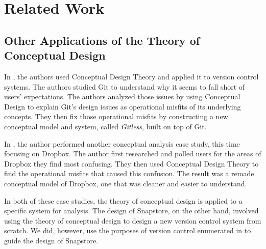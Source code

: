 \chapter{Related Work}

\section{Other Applications of the Theory of Conceptual Design}



In \cite{RossoJackson}, the authors used Conceptual Design Theory and applied it to version control systems. The authors studied Git to understand why it seems to fall short of users' expectations. The authors analyzed those issues by using Conceptual Design to explain Git's design issues as operational misfits of its underlying concepts. They then fix those operational misfits by constructing a new conceptual model and system, called \textit{Gitless}, built on top of Git.

In \cite{Zhang}, the author performed another conceptual analysis case study, this time focusing on Dropbox. The author first researched and polled users for the areas of Dropbox they find most confusing. They then used Conceptual Design Theory to find the operational misfits that caused this confusion. The result was a remade conceptual model of Dropbox, one that was cleaner and easier to understand.

In both of these case studies, the theory of conceptual design is applied to a specific system for analysis. The design of Snapstore, on the other hand, involved using the theory of conceptual design to design a new version control system from scratch. We did, however, use the purposes of version control enumerated in \cite{RossoJackson} to guide the design of Snapstore.


